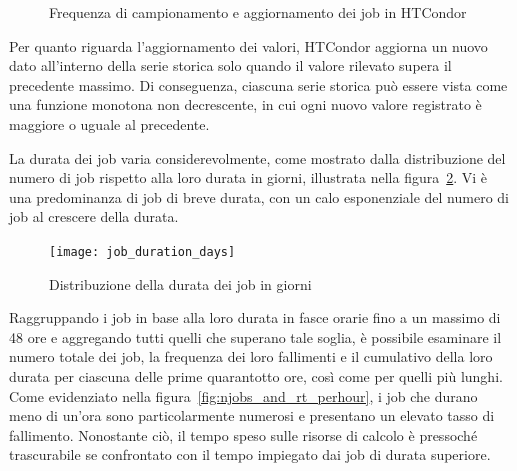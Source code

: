 \begin{figure}[p]
   \centering 
   \caption{\small Frequenza di campionamento e aggiornamento dei job in HTCondor}
   \label{fig:htcondor_sampling}
\end{figure}

Per quanto riguarda l'aggiornamento dei valori, HTCondor aggiorna un nuovo
dato all'interno della serie storica solo quando il valore rilevato supera il
precedente massimo. Di conseguenza, ciascuna serie storica può essere vista
come una funzione monotona non decrescente, in cui ogni nuovo valore
registrato è maggiore o uguale al precedente.

La durata dei job varia considerevolmente, come mostrato dalla distribuzione
del numero di job rispetto alla loro durata in giorni, illustrata nella
figura~\ref{fig:job_duration_days}. Vi è una predominanza di job di breve
durata, con un calo esponenziale del numero di job al crescere della durata.

\begin{figure}[!ht]
   \centering
   \texttt{[image: job\_duration\_days]}
   \caption{Distribuzione della durata dei job in giorni}
   \label{fig:job_duration_days}
\end{figure}

Raggruppando i job in base alla loro durata in fasce orarie fino a un massimo
di 48 ore e aggregando tutti quelli che superano tale soglia, è possibile
esaminare il numero totale dei job, la frequenza dei loro fallimenti e il
cumulativo della loro durata per ciascuna delle prime quarantotto ore, così
come per quelli più lunghi. Come evidenziato nella
figura~\ref{fig:njobs_and_rt_perhour}, i job che durano meno di un'ora sono
particolarmente numerosi e presentano un elevato tasso di fallimento.
Nonostante ciò, il tempo speso sulle risorse di calcolo è pressoché
trascurabile se confrontato con il tempo impiegato dai job di durata
superiore.

